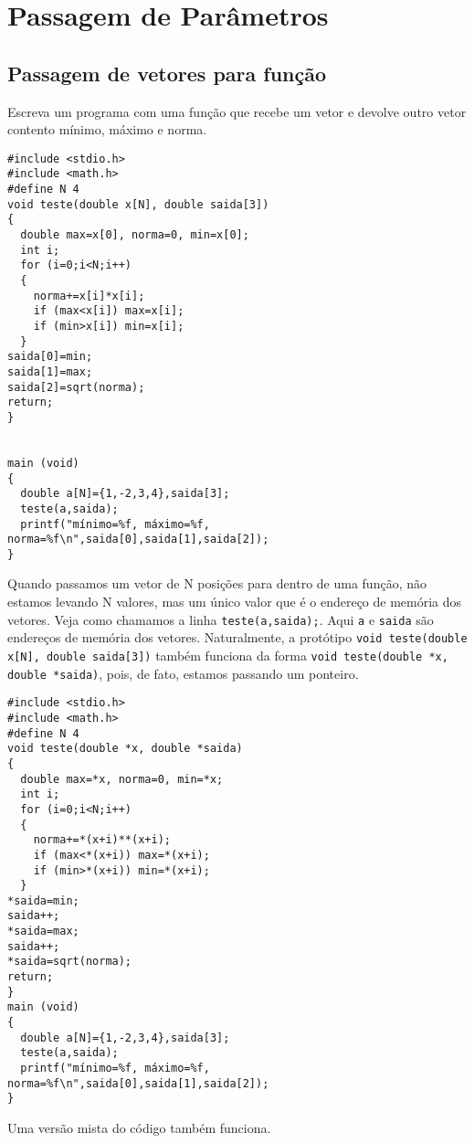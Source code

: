 \chapter{Passagem de Parâmetros}

\section{Passagem de vetores para função}
\begin{ex}
Escreva um programa com uma função que recebe um vetor e devolve outro vetor contento mínimo, máximo e norma.
\end{ex}
\begin{verbatim}
#include <stdio.h>
#include <math.h>
#define N 4
void teste(double x[N], double saida[3])
{
  double max=x[0], norma=0, min=x[0];
  int i;
  for (i=0;i<N;i++) 
  {
    norma+=x[i]*x[i];
    if (max<x[i]) max=x[i];
    if (min>x[i]) min=x[i];
  }
saida[0]=min;
saida[1]=max;
saida[2]=sqrt(norma);
return;
}


main (void)
{
  double a[N]={1,-2,3,4},saida[3];
  teste(a,saida);
  printf("mínimo=%f, máximo=%f, norma=%f\n",saida[0],saida[1],saida[2]);  
}
\end{verbatim}
Quando passamos um vetor de N posições para dentro de uma função, não estamos levando N valores, mas um único valor que é o endereço de memória dos vetores. Veja como chamamos a linha \verb|teste(a,saida);|. Aqui \verb|a| e \verb|saida| são endereços de memória dos vetores. Naturalmente, a protótipo \verb|void teste(double x[N], double saida[3])| também funciona da forma \verb|void teste(double *x, double *saida)|, pois, de fato, estamos passando um ponteiro.
\begin{verbatim}
#include <stdio.h>
#include <math.h>
#define N 4
void teste(double *x, double *saida)
{
  double max=*x, norma=0, min=*x;
  int i;
  for (i=0;i<N;i++) 
  {
    norma+=*(x+i)**(x+i);
    if (max<*(x+i)) max=*(x+i);
    if (min>*(x+i)) min=*(x+i);
  }
*saida=min;
saida++;
*saida=max;
saida++;
*saida=sqrt(norma);
return;
}
main (void)
{
  double a[N]={1,-2,3,4},saida[3];
  teste(a,saida);
  printf("mínimo=%f, máximo=%f, norma=%f\n",saida[0],saida[1],saida[2]);  
}
\end{verbatim}
Uma versão mista do código também funciona.

